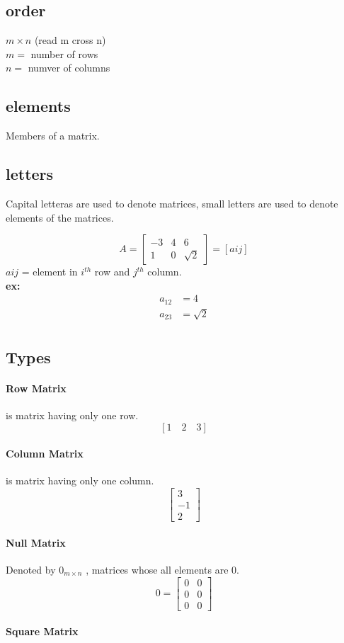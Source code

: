 \documentclass{article}
\begin{document}
\begin{multicols}{2}
\subsection{order}
$m \times n$ (read m cross n)\\
$m =$ number of rows\\
$n =$ numver of columns

\subsection{elements}
Members of a matrix.


\subsection{letters}
Capital letteras are used to denote matrices, small letters are used to denote
elements of the matrices.

\[A=
\begin{bmatrix}
-3 & 4 & 6\\
1 & 0 & \sqrt{2}
\end{bmatrix} 
= [aij]\]
$aij$ = element in $i^{th}$ row and $j^{th}$ column.\\
\textbf{ex:} 
\begin{align*}
    a_{12}&=4\\
    a_{23}&=\sqrt{2}\\
\end{align*}

\subsection{Types}

\paragraph{Row Matrix} is matrix having only one row. \[ [1 \quad 2 \quad 3 ] \]
\paragraph{Column Matrix} is matrix having only one column. 
\[ \begin{bmatrix}
3\\
-1\\
2
\end{bmatrix} \]

\paragraph{Null Matrix} Denoted by $0_{m \times n}$ , matrices whose all elements
are 0. \[ 0= \begin{bmatrix}
    0 & 0\\
    0 & 0\\
    0 & 0
\end{bmatrix} \]

\paragraph{Square Matrix} 


\end{multicols}
\end{document}
